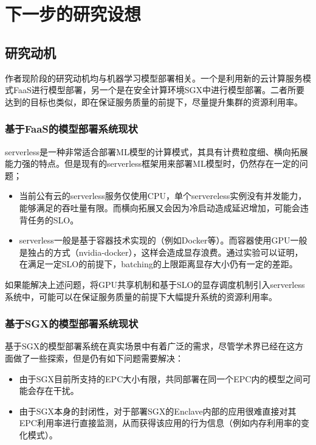 \chapter{下一步的研究设想}

\section{研究动机}

作者现阶段的研究动机均与机器学习模型部署相关。一个是利用新的云计算服务模式FaaS进行模型部署，另一个是在安全计算环境SGX中进行模型部署。二者所要达到的目标也类似，即在保证服务质量的前提下，尽量提升集群的资源利用率。

\subsection{基于FaaS的模型部署系统现状}
serverless是一种非常适合部署ML模型的计算模式，其具有计费粒度细、横向拓展能力强的特点。但是现有的serverless框架用来部署ML模型时，仍然存在一定的问题；
\begin{itemize}
    \item 当前公有云的serverless服务仅使用CPU，单个servereless实例没有并发能力，能够满足的吞吐量有限。而横向拓展又会因为冷启动造成延迟增加，可能会违背任务的SLO。
    \item serverless一般是基于容器技术实现的（例如Docker等）。而容器使用GPU一般是独占的方式（nvidia-docker），这样会造成显存浪费。通过实验可以证明，在满足一定SLO的前提下，batching的上限距离显存大小仍有一定的差距。
\end{itemize}

如果能解决上述问题，将GPU共享机制和基于SLO的显存调度机制引入serverless系统中，可能可以在保证服务质量的前提下大幅提升系统的资源利用率。

\subsection{基于SGX的模型部署系统现状}
基于SGX的模型部署系统在真实场景中有着广泛的需求，尽管学术界已经在这方面做了一些探索，但是仍有如下问题需要解决：
\begin{itemize}
    \item 由于SGX目前所支持的EPC大小有限，共同部署在同一个EPC内的模型之间可能会存在干扰。
    \item 由于SGX本身的封闭性，对于部署SGX的Enclave内部的应用很难直接对其EPC利用率进行直接监测，从而获得该应用的行为信息（例如内存利用率的变化模式）。
\end{itemize}

